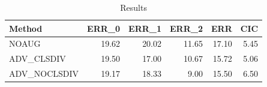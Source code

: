 \begin{table}
\caption{Results}
\label{tab:Results}
\begin{tabular}{lrrrrr}
\toprule
Method & ERR\_0 & ERR\_1 & ERR\_2 & ERR & CIC \\
\midrule
NOAUG & 19.62 & 20.02 & 11.65 & 17.10 & 5.45 \\
ADV\_CLSDIV & 19.50 & 17.00 & 10.67 & 15.72 & 5.06 \\
ADV\_NOCLSDIV & 19.17 & 18.33 & 9.00 & 15.50 & 6.50 \\
\bottomrule
\end{tabular}
\end{table}
